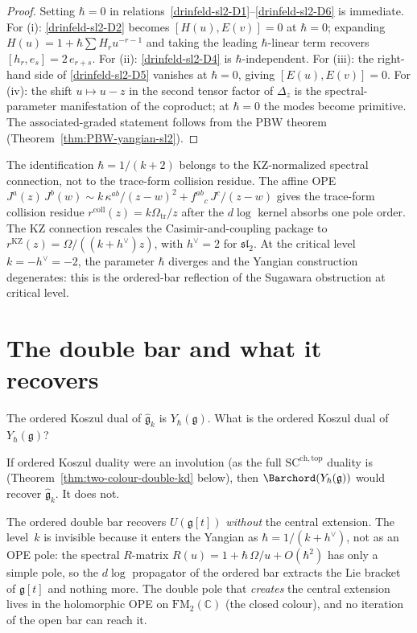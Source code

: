 \begin{proof}
Setting $\hbar = 0$ in relations~\ref{drinfeld-sl2-D1}--\ref{drinfeld-sl2-D6} is immediate.
For (i): \ref{drinfeld-sl2-D2} becomes $[H(u),E(v)] = 0$ at $\hbar = 0$;
expanding $H(u) = 1 + \hbar\sum H_r u^{-r-1}$ and taking
the leading $\hbar$-linear term recovers
$[h_r, e_s] = 2\,e_{r+s}$.
For (ii): \ref{drinfeld-sl2-D4} is $\hbar$-independent.
For (iii): the right-hand side of \ref{drinfeld-sl2-D5} vanishes at $\hbar = 0$,
giving $[E(u),E(v)] = 0$.
For (iv): the shift $u \mapsto u - z$ in the second tensor factor of
$\Delta_z$ is the spectral-parameter manifestation of the coproduct;
at $\hbar = 0$ the modes become primitive.
The associated-graded statement follows from the PBW theorem
(Theorem~\ref{thm:PBW-yangian-sl2}).
\end{proof}

\begin{remark}
\label{rem:hbar-level}
The identification $\hbar = 1/(k+2)$ belongs to the KZ-normalized
spectral connection, not to the trace-form collision residue. The
affine OPE
$J^a(z)\,J^b(w) \sim
k\,\kappa^{ab}/(z{-}w)^2 + f^{ab}{}_c\,J^c/(z{-}w)$
gives the trace-form collision residue
$r^{\mathrm{coll}}(z)=k\Omega_{\mathrm{tr}}/z$ after the
$d\log$ kernel absorbs one pole order. The KZ connection rescales the
Casimir-and-coupling package to
$r^{\mathrm{KZ}}(z)=\Omega/((k+h^\vee)z)$, with
$h^\vee = 2$ for $\mathfrak{sl}_2$.
At the critical level $k = -h^\vee = -2$, the parameter $\hbar$
diverges and the Yangian construction degenerates: this is the
ordered-bar reflection of the Sugawara obstruction at critical level.
\end{remark}


\section{The double bar and what it recovers}
\label{sec:double-bar}

The ordered Koszul dual of $\widehat{\mathfrak{g}}_k$ is
$Y_\hbar(\mathfrak{g})$. What is the ordered Koszul dual of
$Y_\hbar(\mathfrak{g})$?

If ordered Koszul duality were an involution (as the full
$\mathrm{SC}^{\mathrm{ch,top}}$ duality is
(Theorem~\ref{thm:two-colour-double-kd} below), then
$\Barchord(Y_\hbar(\mathfrak{g}))$ would recover
$\widehat{\mathfrak{g}}_k$. It does not.

The ordered double bar recovers $U(\mathfrak{g}[t])$
\emph{without} the central extension. The level~$k$ is invisible
because it enters the Yangian as $\hbar = 1/(k{+}h^\vee)$, not as an
OPE pole: the spectral $R$-matrix $R(u) = 1 + \hbar\,\Omega/u +
O(\hbar^2)$ has only a simple pole, so the $d\log$ propagator of the
ordered bar extracts the Lie bracket of $\mathfrak{g}[t]$ and nothing
more. The double pole that \emph{creates} the central extension lives
in the holomorphic OPE on $\mathrm{FM}_2(\mathbb{C})$ (the closed
colour), and no iteration of the open bar can reach it.

